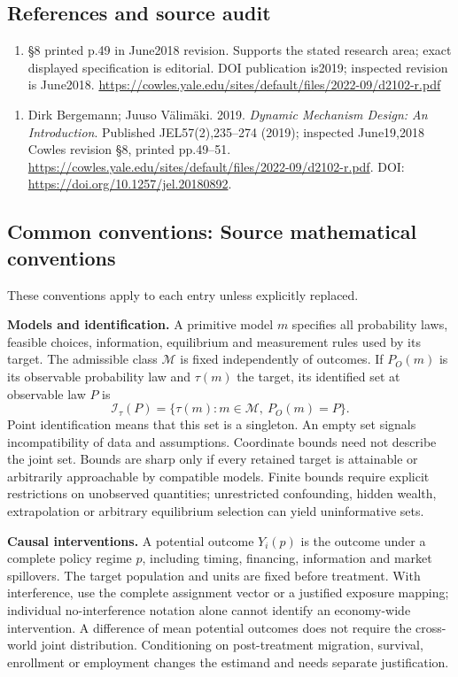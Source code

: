 \documentclass[11pt,a4paper]{article}
\begin{document}
\subsection*{References and source audit}
\begin{enumerate}
\item §8 printed p.49 in June2018 revision. Supports the stated research area; exact displayed specification is editorial. DOI publication is2019; inspected revision is June2018. \url{https://cowles.yale.edu/sites/default/files/2022-09/d2102-r.pdf}
\end{enumerate}
\begin{enumerate}\raggedright
\item\hypertarget{definitions:source:30007575:1}{} Dirk Bergemann; Juuso Välimäki. 2019. \emph{Dynamic Mechanism Design: An Introduction}. Published JEL57(2),235–274 (2019); inspected June19,2018 Cowles revision §8, printed pp.49–51.
\url{https://cowles.yale.edu/sites/default/files/2022-09/d2102-r.pdf}.
DOI: \url{https://doi.org/10.1257/jel.20180892}.
\end{enumerate}

\subsection*{Common conventions: Source mathematical conventions}

These conventions apply to each entry unless explicitly replaced.

\textbf{Models and identification.} A primitive model \(m\) specifies all probability laws, feasible choices, information, equilibrium and measurement rules used by its target. The admissible class \(\mathcal M\) is fixed independently of outcomes. If \(P_O(m)\) is its observable probability law and \(\tau(m)\) the target, its identified set at observable law \(P\) is
\[
 \mathcal I_\tau(P)=\{\tau(m):m\in\mathcal M,\ P_O(m)=P\}.
\]
Point identification means that this set is a singleton. An empty set signals incompatibility of data and assumptions. Coordinate bounds need not describe the joint set. Bounds are sharp only if every retained target is attainable or arbitrarily approachable by compatible models. Finite bounds require explicit restrictions on unobserved quantities; unrestricted confounding, hidden wealth, extrapolation or arbitrary equilibrium selection can yield uninformative sets.

\textbf{Causal interventions.} A potential outcome \(Y_i(p)\) is the outcome under a complete policy regime \(p\), including timing, financing, information and market spillovers. The target population and units are fixed before treatment. With interference, use the complete assignment vector or a justified exposure mapping; individual no-interference notation alone cannot identify an economy-wide intervention. A difference of mean potential outcomes does not require the cross-world joint distribution. Conditioning on post-treatment migration, survival, enrollment or employment changes the estimand and needs separate justification.
\end{document}
